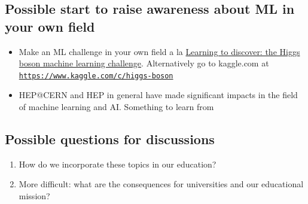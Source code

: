 \documentclass[%
oneside,                 %
final,                   %
10pt]{article}
\begin{document}
\subsection{Possible start to raise awareness about ML in your own field}
\begin{block}{}
\begin{itemize}
\item Make an ML challenge in your own field a la \href{{https://home.cern/news/news/computing/higgs-boson-machine-learning-challenge}}{Learning to discover: the Higgs boson machine learning challenge}. Alternatively go to kaggle.com at \href{{https://www.kaggle.com/c/higgs-boson}}{\nolinkurl{https://www.kaggle.com/c/higgs-boson}}

\item HEP@CERN and HEP in general have made significant impacts in the field of machine learning and AI. Something to learn from
\end{itemize}

\noindent
\end{block}

\subsection{Possible questions for discussions}

\begin{enumerate}
\item How do we incorporate these topics in our education?

\item More difficult: what are the consequences for universities and our educational mission?
\end{enumerate}

\noindent


\end{document}
